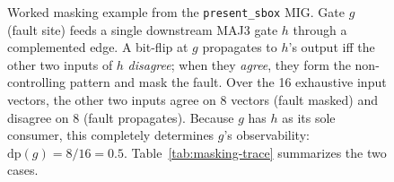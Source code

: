 \begin{figure}[tbp]
  \caption{Worked masking example from the \texttt{present\_sbox} MIG.
    Gate $g$ (fault site) feeds a single downstream MAJ3 gate $h$
    through a complemented edge. A bit-flip at $g$ propagates to $h$'s
    output iff the other two inputs of $h$ \emph{disagree}; when they
    \emph{agree}, they form the non-controlling pattern and mask the
    fault. Over the 16 exhaustive input vectors, the other two inputs
    agree on 8 vectors (fault masked) and disagree on 8 (fault propagates). Because $g$ has $h$ as its sole consumer, this
    completely determines $g$'s observability: $\mathrm{dp}(g) = 8/16
    = 0.5$. Table~\ref{tab:masking-trace} summarizes the two cases.}
  \label{fig:masking-example}
\end{figure}
